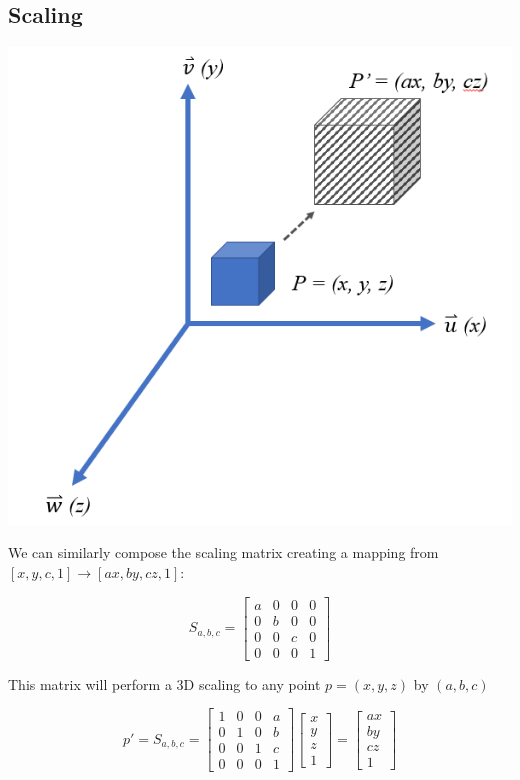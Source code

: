 \documentclass[12pt,letterpaper]{article}
\begin{document}
\subsection{Scaling}
\includegraphics[scale=0.75]{scale}

We can similarly compose the scaling matrix creating a mapping from \\ $[x, y, c, 1] \rightarrow [ax, by, cz, 1]$:

\begin{equation}
    S_{a, b, c} = \begin{bmatrix}
        a & 0 & 0 & 0 \\
        0 & b & 0 & 0 \\
        0 & 0 & c & 0 \\
        0 & 0 & 0 & 1
    \end{bmatrix}
\end{equation}

\newpage

This matrix will perform a 3D scaling to any point $p = (x, y, z)$ by $(a, b, c)$

\begin{equation}
    p' = S_{a, b, c} = \begin{bmatrix}
        1 & 0 & 0 & a \\
        0 & 1 & 0 & b \\
        0 & 0 & 1 & c \\
        0 & 0 & 0 & 1
    \end{bmatrix}
    \begin{bmatrix}
        x \\
        y \\
        z \\
        1
    \end{bmatrix}
    = \begin{bmatrix}
        ax \\
        by \\
        cz \\
        1
    \end{bmatrix}
\end{equation}
\end{document}
